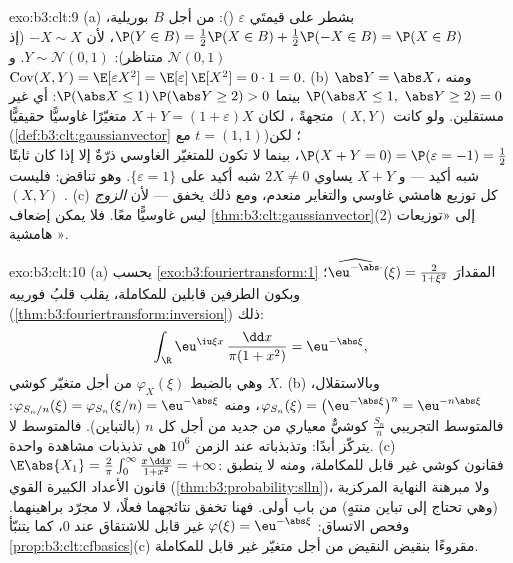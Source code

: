 \begin{solution}{exo:b3:clt:9}
(a) بشطر  على قيمتَي $\varepsilon$ (): من أجل
$B$ بوريلية، $\P(Y \in B) =
\frac12\P(X \in B) + \frac12\P(-X \in B) = \P(X \in B)$، لأن $-X \sim X$ (إذ $\mathcal N(0,1)$ متناظر):
$Y \sim
\mathcal N(0,1)$. و $\operatorname{Cov}(X, Y) =
\E[\varepsilon X^2] = \E[\varepsilon]\,\E[X^2] = 0 \cdot 1 =
0$.
(b) $\abs Y = \abs X$، ومنه $\P(\abs X \leq 1,\ \abs Y \geq 2)
= 0$ بينما $\P(\abs X \leq 1)\,\P(\abs Y \geq 2) > 0$: أي غير مستقلين. ولو
كانت $(X, Y)$ متجهةً ، لكان $X + Y =
(1 + \varepsilon)X$ متغيّرًا غاوسيًّا
حقيقيًّا (\cref{def:b3:clt:gaussianvector} مع $t = (1,1)$)؛ لكن $\P(X + Y = 0) = \P(\varepsilon = -1) = \frac12$، بينما لا
تكون للمتغيّر الغاوسي ذرّةٌ إلا إذا كان ثابتًا شبه أكيد ---
و $X + Y$ يساوي $2X \neq 0$ شبه أكيد على $\{\varepsilon = 1\}$. وهو تناقض:
فليست $(X, Y)$ .
(c) كل توزيع هامشي غاوسي والتغاير منعدم، ومع ذلك يخفق 
--- لأن \emph{الزوج} ليس غاوسيًّا معًا. فلا يمكن إضعاف
\cref{thm:b3:clt:gaussianvector}(2) إلى «توزيعات هامشية ».
\end{solution}

\begin{solution}{exo:b3:clt:10}
(a) يحسب \cref{exo:b3:fouriertransform:1} المقدارَ
$\widehat{\eu^{-\abs\cdot}}(\xi) = \frac{2}{1 + \xi^2}$؛
وبكون الطرفين قابلين للمكاملة، يقلب قلبُ فورييه (\cref{thm:b3:fouriertransform:inversion})
ذلك:
\[
\int_\R\eu^{\iu\xi x}\,\frac{\dd x}{\pi(1 + x^2)} =
\eu^{-\abs\xi},
\]
وهي بالضبط $\varphi_X(\xi)$ من أجل متغيّر كوشي $X$.
(b) وبالاستقلال، $\varphi_{S_n}(\xi) =
\bigl(\eu^{-\abs\xi}\bigr)^n = \eu^{-n\abs\xi}$، ومنه $\varphi_{S_n/n}(\xi) = \varphi_{S_n}(\xi/n) =
\eu^{-\abs\xi}$: فالمتوسط التجريبي
$\frac{S_n}n$ كوشيٌّ معياري من جديد من أجل كل $n$ (بالتباين).
فالمتوسط لا يتركّز أبدًا: وتذبذباته عند الزمن $10^6$ هي تذبذبات
مشاهدة واحدة.
(c) $\E\abs{X_1} = \frac2\pi\int_0^\infty\frac{x\,\dd x}{1 +
x^2} = +\infty$: فقانون كوشي غير قابل للمكاملة، ومنه لا ينطبق قانون
الأعداد الكبيرة القوي (\cref{thm:b3:probability:slln})، ولا مبرهنة النهاية
المركزية (وهي تحتاج إلى تباين منتهٍ) من باب أولى. فهنا تخفق
نتائجهما فعلًا، لا مجرّد براهينهما. وفحص الاتساق: $\varphi(\xi) = \eu^{-\abs\xi}$ غير
قابل للاشتقاق عند $0$، كما يتنبّأ \cref{prop:b3:clt:cfbasics}(c) مقروءًا
بنقيض النقيض من أجل متغيّر غير قابل للمكاملة.
\end{solution}

